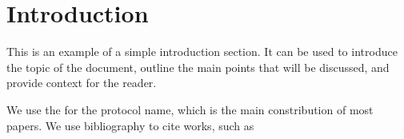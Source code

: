\section{Introduction}

This is an example of a simple introduction section. It can be used to introduce the topic of the document, outline the main points that will be discussed, and provide context for the reader.

We use the \ours for the protocol name, which is the main constribution of most papers.
We use bibliography to cite works, such as \cite{CCS:KKRT16, EC:RinSch21}





